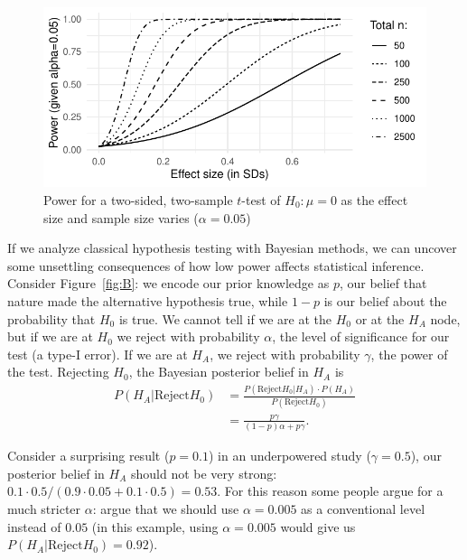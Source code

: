 \documentclass[twoside]{article}
\begin{document}
\begin{figure}[tb]
\includegraphics[width=\textwidth]{../graphs/powergraph}

\caption{Power for a two-sided, two-sample $t$-test of $H_0: \mu=0$ as the effect 
size and sample size varies ($\alpha=0.05$)}\label{fig:power}
\end{figure}


If we analyze classical hypothesis testing with Bayesian methods, we can uncover
some unsettling consequences of how low power affects statistical inference.
Consider Figure~\ref{fig:B}: we encode our prior knowledge as $p$, our belief
that nature made the alternative hypothesis true, while $1-p$ is our belief
about the probability that $H_0$ is true. We cannot tell if we are at the
$H_0$ or at the $H_A$ node, but if we are at $H_0$ we reject with probability $\alpha$,
the level of significance for our test (a type-I error). If we are at $H_{\!A}$, we
reject with probability $\gamma$, the power of the test. Rejecting $H_0$, the
Bayesian posterior belief in $H_{\!A}$ is
\begin{align*}
   P(H_{\!A}|\mathrm{Reject} H_0) & = \frac{P(\mathrm{Reject} H_0|H_{\!A}) \cdot P(H_{\!A})}{P(\mathrm{Reject} H_0)} \\
   &= \frac{p\gamma}{(1-p)\alpha + p\gamma}.  
\end{align*}

Consider a surprising result ($p=0.1$) in an underpowered study ($\gamma=0.5$),
our posterior belief in $H_{\!A}$ should not be very strong: $0.1\cdot 0.5 /
(0.9\cdot 0.05 + 0.1\cdot 0.5) = 0.53$. For this reason some people argue for a
much stricter $\alpha$: \citet{Benjamin2017} argue that we should use
$\alpha=0.005$ as a conventional level instead of $0.05$ (in this example, using
$\alpha=0.005$ would give us $P(H_{\!A}|\mathrm{Reject} H_0)=0.92$). 
\end{document}
